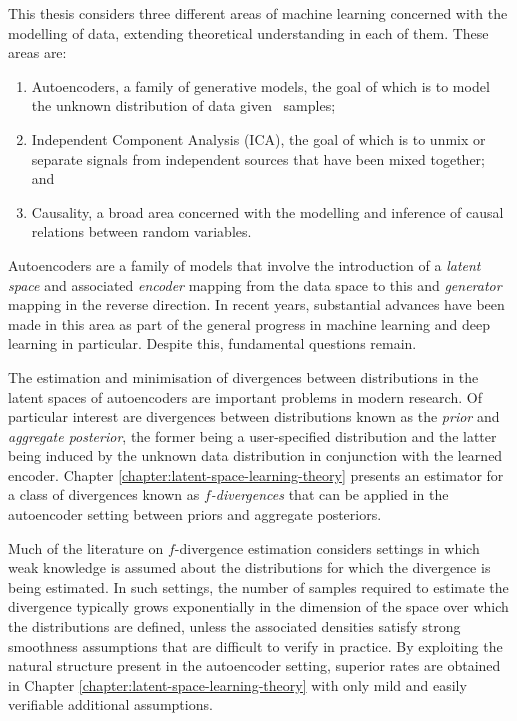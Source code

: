 This thesis considers three different areas of machine learning concerned with the modelling of data, extending theoretical understanding in each of them.
These areas are:
\begin{enumerate}
\item Autoencoders, a family of generative models, the goal of which is to model the unknown distribution of data given \iid~samples;
\item Independent Component Analysis (ICA), the goal of which is to unmix or separate signals from independent sources that have been mixed together; and
\item Causality, a broad area concerned with the modelling and inference of causal relations between random variables.
\end{enumerate}
Autoencoders are a family of models that involve the introduction of a \emph{latent space} and associated \emph{encoder} mapping from the data space to this and \emph{generator} mapping in the reverse direction. 
In recent years, substantial advances have been made in this area as part of the general progress in machine learning and deep learning in particular.
Despite this, fundamental questions remain.

The estimation and minimisation of divergences between distributions in the latent spaces of autoencoders are important problems in modern research.
Of particular interest are divergences between distributions known as the \emph{prior} and \emph{aggregate posterior}, the former being a user-specified distribution and the latter being induced by the unknown data distribution in conjunction with the learned encoder.
Chapter \ref{chapter:latent-space-learning-theory} presents an estimator for a class of divergences known as \emph{$f$-divergences} that can be applied in the autoencoder setting between priors and aggregate posteriors. 

Much of the literature on $f$-divergence estimation considers settings in which weak knowledge is assumed about the distributions for which the divergence is being estimated. 
In such settings, the number of samples required to estimate the divergence typically grows exponentially in the dimension of the space over which the distributions are defined, unless the associated densities satisfy strong smoothness assumptions that are difficult to verify in practice.
By exploiting the natural structure present in the autoencoder setting, superior rates are obtained in Chapter \ref{chapter:latent-space-learning-theory} with only mild and easily verifiable additional assumptions.

